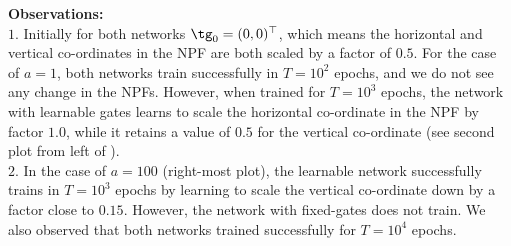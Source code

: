 \textbf{Observations:}\\
$1.$ Initially for both networks $\tg_0=(0,0)^\top$, which means the horizontal and vertical co-ordinates in the NPF are both scaled by a factor of $0.5$. For the case of $a=1$, both networks train successfully in $T=10^2$ epochs, and we do not see any change in the NPFs. However, when trained for $T=10^3$ epochs, the network with learnable gates learns to scale the horizontal co-ordinate in the NPF by factor $1.0$, while it retains a value of $0.5$ for the vertical co-ordinate (see second plot from left of ).\\
$2.$ In the case of $a=100$ (right-most plot), the learnable network successfully trains in $T=10^3$ epochs by learning to scale the vertical co-ordinate down by a factor close to $0.15$. However, the network with fixed-gates does not train. We also observed that both networks trained successfully for $T=10^4$ epochs.
\FloatBarrier
